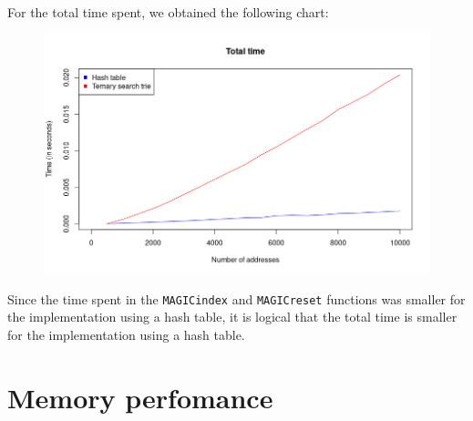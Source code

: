 \documentclass[a4paper, 11pt, oneside]{article}
\begin{document}
\paragraph{}For the total time spent, we obtained the following chart:
\begin{figure}[H]
  \centering
  \includegraphics[scale=.5]{plots/general.png}
\end{figure}
Since the time spent in the \texttt{MAGICindex} and \texttt{MAGICreset} functions was smaller for the implementation using a hash table, it is logical that the total time is smaller for the implementation using a hash table.

\section{Memory perfomance}
\end{document}
